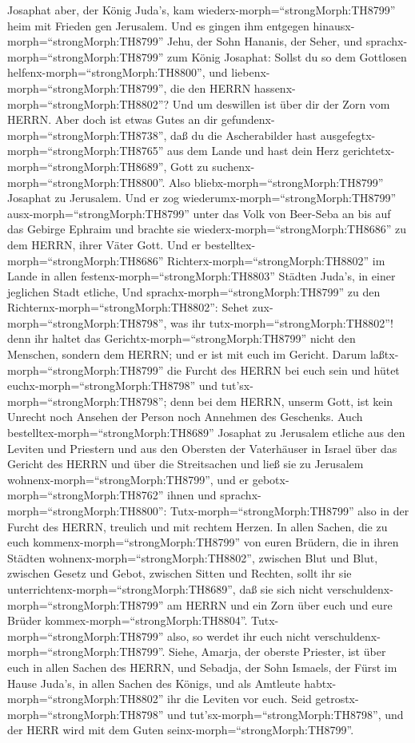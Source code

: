  Josaphat aber, der König Juda's, kam
wiederx-morph=``strongMorph:TH8799'' heim mit Frieden gen Jerusalem.
 Und es gingen ihm entgegen
hinausx-morph=``strongMorph:TH8799'' Jehu, der Sohn Hananis, der Seher,
und sprachx-morph=``strongMorph:TH8799'' zum König Josaphat: Sollst du
so dem Gottlosen helfenx-morph=``strongMorph:TH8800'', und
liebenx-morph=``strongMorph:TH8799'', die den HERRN
hassenx-morph=``strongMorph:TH8802''? Und um deswillen ist über dir der
Zorn vom HERRN.  Aber doch ist etwas Gutes an dir
gefundenx-morph=``strongMorph:TH8738'', daß du die Ascherabilder hast
ausgefegtx-morph=``strongMorph:TH8765'' aus dem Lande und hast dein Herz
gerichtetx-morph=``strongMorph:TH8689'', Gott zu
suchenx-morph=``strongMorph:TH8800''.  Also
bliebx-morph=``strongMorph:TH8799'' Josaphat zu Jerusalem. Und er zog
wiederumx-morph=``strongMorph:TH8799'' ausx-morph=``strongMorph:TH8799''
unter das Volk von Beer-Seba an bis auf das Gebirge Ephraim und brachte
sie wiederx-morph=``strongMorph:TH8686'' zu dem HERRN, ihrer Väter Gott.
 Und er bestelltex-morph=``strongMorph:TH8686''
Richterx-morph=``strongMorph:TH8802'' im Lande in allen
festenx-morph=``strongMorph:TH8803'' Städten Juda's, in einer jeglichen
Stadt etliche,  Und sprachx-morph=``strongMorph:TH8799'' zu
den Richternx-morph=``strongMorph:TH8802'': Sehet
zux-morph=``strongMorph:TH8798'', was ihr
tutx-morph=``strongMorph:TH8802''! denn ihr haltet das
Gerichtx-morph=``strongMorph:TH8799'' nicht den Menschen, sondern dem
HERRN; und er ist mit euch im Gericht.  Darum
laßtx-morph=``strongMorph:TH8799'' die Furcht des HERRN bei euch sein
und hütet euchx-morph=``strongMorph:TH8798'' und
tut'sx-morph=``strongMorph:TH8798''; denn bei dem HERRN, unserm Gott,
ist kein Unrecht noch Ansehen der Person noch Annehmen des Geschenks.
 Auch bestelltex-morph=``strongMorph:TH8689'' Josaphat zu
Jerusalem etliche aus den Leviten und Priestern und aus den Obersten der
Vaterhäuser in Israel über das Gericht des HERRN und über die
Streitsachen und ließ sie zu Jerusalem
wohnenx-morph=``strongMorph:TH8799'',  und er
gebotx-morph=``strongMorph:TH8762'' ihnen und
sprachx-morph=``strongMorph:TH8800'': Tutx-morph=``strongMorph:TH8799''
also in der Furcht des HERRN, treulich und mit rechtem Herzen.
 In allen Sachen, die zu euch
kommenx-morph=``strongMorph:TH8799'' von euren Brüdern, die in ihren
Städten wohnenx-morph=``strongMorph:TH8802'', zwischen Blut und Blut,
zwischen Gesetz und Gebot, zwischen Sitten und Rechten, sollt ihr sie
unterrichtenx-morph=``strongMorph:TH8689'', daß sie sich nicht
verschuldenx-morph=``strongMorph:TH8799'' am HERRN und ein Zorn über
euch und eure Brüder kommex-morph=``strongMorph:TH8804''.
Tutx-morph=``strongMorph:TH8799'' also, so werdet ihr euch nicht
verschuldenx-morph=``strongMorph:TH8799''.  Siehe, Amarja,
der oberste Priester, ist über euch in allen Sachen des HERRN, und
Sebadja, der Sohn Ismaels, der Fürst im Hause Juda's, in allen Sachen
des Königs, und als Amtleute habtx-morph=``strongMorph:TH8802'' ihr die
Leviten vor euch. Seid getrostx-morph=``strongMorph:TH8798'' und
tut'sx-morph=``strongMorph:TH8798'', und der HERR wird mit dem Guten
seinx-morph=``strongMorph:TH8799''.

